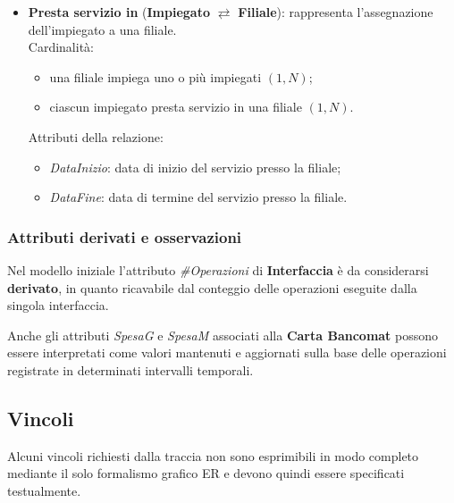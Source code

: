 \begin{itemize}
  \item \textbf{Presta servizio in} (\textbf{Impiegato} $\rightleftarrows$ \textbf{Filiale}): rappresenta l'assegnazione dell'impiegato a una filiale.\\
  Cardinalità:
  \begin{itemize}
    \item una filiale impiega uno o più impiegati \((1,N)\);
    \item ciascun impiegato presta servizio in una filiale \((1,N)\).
  \end{itemize}
  Attributi della relazione:
  \begin{itemize}
    \item \textit{DataInizio}: data di inizio del servizio presso la filiale;
    \item \textit{DataFine}: data di termine del servizio presso la filiale.
  \end{itemize}
\end{itemize}

\subsubsection{Attributi derivati e osservazioni}

Nel modello iniziale l'attributo \textit{\#Operazioni} di \textbf{Interfaccia} è da considerarsi \textbf{derivato}, in quanto ricavabile dal conteggio delle operazioni eseguite dalla singola interfaccia.

Anche gli attributi \textit{SpesaG} e \textit{SpesaM} associati alla \textbf{Carta Bancomat} possono essere interpretati come valori mantenuti e aggiornati sulla base delle operazioni registrate in determinati intervalli temporali.

\subsection{Vincoli}
Alcuni vincoli richiesti dalla traccia non sono esprimibili in modo completo mediante il solo formalismo grafico ER e devono quindi essere specificati testualmente.

